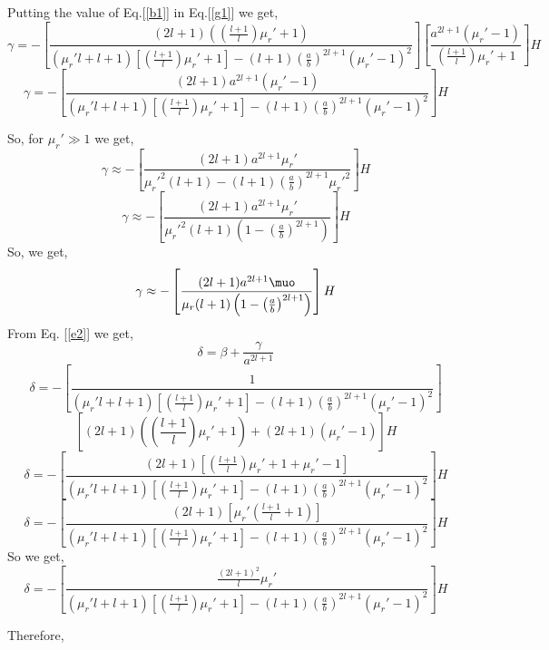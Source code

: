 Putting the value of Eq.[\ref{b1}] in Eq.[\ref{g1}] we get,
$$\gamma=-\left[\frac{(2l+1)\left(\left(\frac{l+1}{l}\right)\mu_r'+1\right)}{(\mu_r'l+l+1)\left[\left(\frac{l+1}{l}\right)\mu_r'+1\right]-(l+1)\left(\frac{a}{b}\right)^{2l+1}(\mu_r'-1)^2}\right] \left[\frac{a^{2l+1}(\mu_r'-1)}{\left(\frac{l+1}{l}\right)\mu_r'+1}\right]H$$
\begin{equation}
\gamma=-\left[\frac{(2l+1)a^{2l+1}(\mu_r'-1)}{(\mu_r'l+l+1)\left[\left(\frac{l+1}{l}\right)\mu_r'+1\right]-(l+1)\left(\frac{a}{b}\right)^{2l+1}(\mu_r'-1)^2}\right] H    
\end{equation}


So, for \(\mu_r'\gg 1\) we get,
$$\gamma\approx-\left[\frac{(2l+1)a^{2l+1}\mu_r'}{\mu_r'^2(l+1)-(l+1)\left(\frac{a}{b}\right)^{2l+1}\mu_r'^2}\right] H$$
$$\gamma\approx-\left[\frac{(2l+1)a^{2l+1}\mu_r'}{\mu_r'^2(l+1)\left(1-\left(\frac{a}{b}\right)^{2l+1}\right)}\right] H$$
So, we get,
\begin{equation}\label{g2}
\gamma\approx-\left[\frac{(2l+1)a^{2l+1}\muo}{\mu_r(l+1)\left(1-\left(\frac{a}{b}\right)^{2l+1}\right)}\right] H
\end{equation}
From Eq. [\ref{e2}] we get,
$$\delta =\beta+\frac{\gamma}{a^{2l+1}}$$
$$\delta =-\left[\frac{1}{(\mu_r'l+l+1)\left[\left(\frac{l+1}{l}\right)\mu_r'+1\right]-(l+1)\left(\frac{a}{b}\right)^{2l+1}(\mu_r'-1)^2}\right]$$ $$\left[(2l+1)\left(\left(\frac{l+1}{l}\right)\mu_r'+1\right)+(2l+1)(\mu_r'-1)\right]H$$
$$\delta =-\left[\frac{(2l+1)\left[\left(\frac{l+1}{l}\right)\mu_r'+1+\mu_r'-1\right]}{(\mu_r'l+l+1)\left[\left(\frac{l+1}{l}\right)\mu_r'+1\right]-(l+1)\left(\frac{a}{b}\right)^{2l+1}(\mu_r'-1)^2}\right]H$$
$$\delta =-\left[\frac{(2l+1)\left[\mu_r'\left(\frac{l+1}{l}+1\right)\right]}{(\mu_r'l+l+1)\left[\left(\frac{l+1}{l}\right)\mu_r'+1\right]-(l+1)\left(\frac{a}{b}\right)^{2l+1}(\mu_r'-1)^2}\right]H$$
So we get,
\begin{equation}
\delta =-\left[\frac{\frac{(2l+1)^2}{l}\mu_r'}{(\mu_r'l+l+1)\left[\left(\frac{l+1}{l}\right)\mu_r'+1\right]-(l+1)\left(\frac{a}{b}\right)^{2l+1}(\mu_r'-1)^2}\right]H    
\end{equation}


Therefore,

